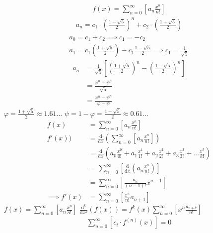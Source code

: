 \documentclass{article}
\begin{document}
\begin{align*}
f\left( x \right)= \sum^{\infty}_{n= 0}   \left[ a_n \frac{x^n}{n!} \right]
\end{align*}
\begin{align*}
a_n = c_1\cdot  \left( \frac{1- \sqrt{5} }{2} \right)^n +  c_2 \cdot  \left( \frac{1+  \sqrt{5} }{2} \right)
\end{align*}
\begin{align*}
a_0= c_1 +  c_2  \implies  c_1= - c_2\\
a_1= c_1 \left( \frac{1+ \sqrt{5} }{2} \right) -  c_1 \frac{1-\sqrt{5} }{2}  \implies  c_1 = \frac{1}{\sqrt{5} }
\end{align*}
\begin{align}
    a_n &= \frac{1}{\sqrt{5} } \left[ \left( \frac{1+  \sqrt{5} }{2}  \right)^n -  \left( \frac{1- \sqrt{5} }{2} \right)^n \right] \nonumber \\
&= \frac{\varphi^n - \psi^n}{\sqrt{5} } \nonumber\\
&=\frac{\varphi^n -  \psi^n}{\varphi - \psi} \label{eq:fib-sol}
\end{align}
$\varphi = \frac{1+ \sqrt{5} }{2} \approx 1.61\ldots$
$\psi = 1-\varphi = \frac{1- \sqrt{5} }{2} \approx 0.61\ldots$
\begin{align}
    f\left( x \right) &= \sum^{\infty}_{n= 0}   \left[ a_n \frac{x^n}{n!} \right] \label{eq:exp-pow-series} \\
f'\left( x \right)) &= \frac{\mathrm{d} }{\mathrm{d} x}\left( \sum^{\infty}_{n= 0}   \left[ a_n \frac{x^n}{n!} \right]  \right) \nonumber \\
&= \frac{\mathrm{d}}{\mathrm{d} x} \left( a_0 \frac{x^0}{0!} +  a_1 \frac{x^1}{1!} +  a_2 \frac{x^2}{2!}+  a_3 \frac{x^3}{3! } +  \ldots \frac{x^k}{k!} \right) \nonumber \\
&= \sum^{\infty}_{n= 0}   \left[ \frac{\mathrm{d} }{\mathrm{d} x}\left( a_n \frac{x^n}{n!} \right) \right] \nonumber \\
&= \sum^{\infty}_{n= 0}   {\left[{ \frac{a_n}{{\left({ n- 1 }\right)!}} } x^{n- 1}  \right]} \nonumber \\
\implies f'(x) &= \sum^{\infty}_{n= 0}   {\left[{ \frac{x^n}{n!}a_{n+  1} }\right]} \label{eq:exp-pow-series-sol}
\end{align}
$f\left( x \right)= \sum^{\infty}_{n= 0 } \left[ a_n \frac{x^n}{n!} \right]$
$\frac{\mathrm{d}^k }{\mathrm{d} x^k} \left(  f\left( x \right) \right)= f^{k} \left( x \right) \sum^{\infty}_{n= 0}   \left[ x^n \frac{a_{n+  k}}{n!} \right]$
\begin{align}
\sum^{\infty}_{n=0} \left[ c_{i} \cdot f^{(n)}(x) \right] = 0 \label{eq:hom-ode}
\end{align}
\end{document}
